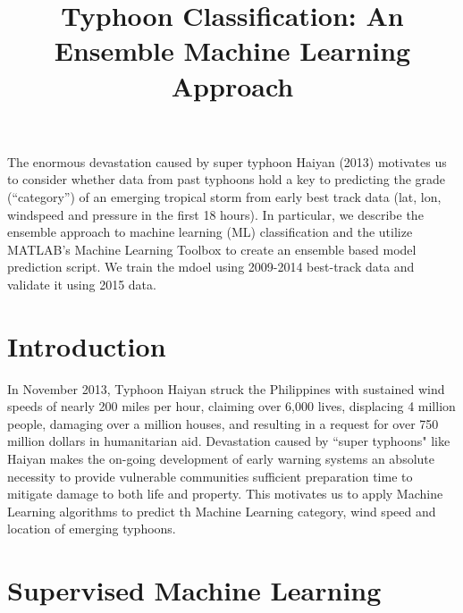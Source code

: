 \documentclass{SBCbookchapter}
\title{Typhoon Classification: An Ensemble Machine Learning Approach}
\begin{document}
\maketitle



\vspace{.3in}
\begin{minipage}[r]{4.25in}{\small
  The enormous devastation caused by super typhoon Haiyan (2013) motivates us to consider whether data from past typhoons hold a key to predicting the grade (``category'') of an emerging tropical storm from early best track data (lat, lon, windspeed and pressure in the first 18 hours). In particular, we describe the ensemble approach to machine learning (ML) classification and the utilize MATLAB's Machine Learning Toolbox to create an ensemble based model prediction script. We train the mdoel using 2009-2014 best-track data and validate it using 2015 data.}
\end{minipage}

\newpage

\section{Introduction}

  In November 2013, Typhoon Haiyan struck the Philippines with sustained wind speeds of nearly 200
miles per hour, claiming over 6,000 lives, displacing 4 million people, damaging over a million houses,
and resulting in a request for over 750 million dollars
in humanitarian aid. Devastation caused by
``super typhoons" like Haiyan makes the on-going
development of early warning systems an absolute
necessity to provide vulnerable communities sufficient preparation time to
mitigate damage to both life and property. This motivates us to apply Machine Learning algorithms to predict th Machine Learning category, wind speed and location of emerging typhoons.

\section{Supervised Machine Learning}
\end{document}
